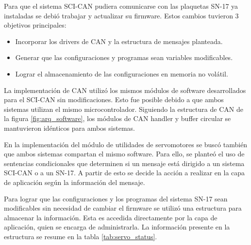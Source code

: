 Para que el sistema SCI-CAN pudiera comunicarse con las plaquetas SN-17 ya instaladas se debió trabajar y actualizar su firmware. Estos cambios tuvieron 3 objetivos principales:
\begin{itemize}
	\item Incorporar los drivers de CAN y la estructura de mensajes planteada.
	\item Generar que las configuraciones y programas sean variables modificables.
	\item Lograr el almacenamiento de las configuraciones en memoria no volátil.
\end{itemize}

La implementación de CAN utilizó los mismos módulos de software desarrollados para el SCI-CAN sin modificaciones. Esto fue posible debido a que ambos sistemas utilizan el mismo microcontrolador. Siguiendo la estructura de CAN de la figura \ref{fig:arq_software}, los módulos de CAN handler y buffer circular se mantuvieron idénticos para ambos sistemas.

En la implementación del módulo de utilidades de servomotores se buscó también que ambos sistemas compartan el mismo software. Para ello, se planteó el uso de sentencias condicionales que determinen si un mensaje está dirigido a un sistema SCI-CAN o a un SN-17. A partir de esto se decide la acción a realizar en la capa de aplicación según la información del mensaje.

Para lograr que las configuraciones y los programas del sistema SN-17 sean modificables sin necesidad de cambiar el firmware se utilizó una estructura para almacenar la información. Esta es accedida directamente por la capa de aplicación, quien se encarga de administrarla. La información presente en la estructura se resume en la tabla \ref{tab:servo_status}.

